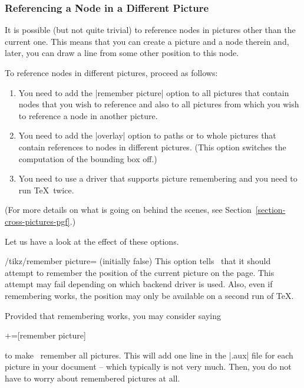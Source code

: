 \label{section-cross-picture-tikz}

\subsubsection{Referencing a Node in a Different Picture}

It is possible (but not quite trivial) to reference nodes in pictures
other than the current one. This means that you can create a picture
and a node therein and, later, you can draw a line from some other
position to this node.

To reference nodes in different pictures, proceed as follows:
\begin{enumerate}
\item You need to add the |remember picture| option to all pictures
  that contain nodes that you wish to reference and also to all
  pictures from which you wish to reference a node in another
  picture.
\item You need to add the |overlay| option to paths or to whole
  pictures that contain references to nodes in different
  pictures. (This option switches the computation of the
  bounding box off.)
\item You need to use a driver that supports picture remembering and
  you need to run \TeX\ twice.
\end{enumerate}
(For more details on what is going on behind the scenes, see
Section~\ref{section-cross-pictures-pgf}.)

Let us have a look at the effect of these options.
\begin{key}{/tikz/remember picture= (initially false)}
  This option tells \tikzname\ that it should attempt to remember the
  position of the current picture on the page. This attempt may fail
  depending on which backend driver is used. Also, even if remembering
  works, the position may only be available on a second run of \TeX.

  Provided that remembering works, you may consider saying
\begin{codeexample}
+=[remember picture]
\end{codeexample}
  to make \tikzname\ remember all pictures. This will add one line in
  the |.aux| file for each picture in your document -- which typically
  is not very much. Then, you do not have to worry about remembered
  pictures at all.
\end{key}

